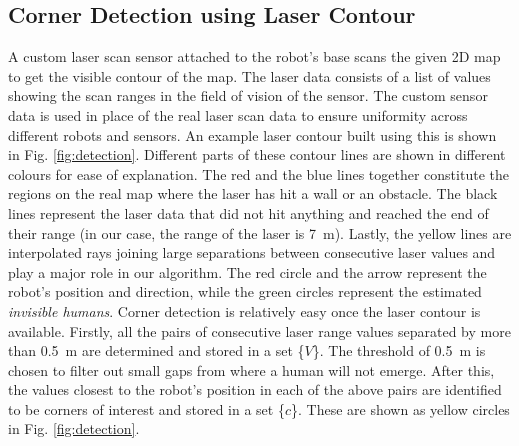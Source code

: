 \subsection{Corner Detection using Laser Contour}
A custom laser scan sensor attached to the robot's base scans the given 2D map to get the visible contour of the map. The laser data consists of a list of values showing the scan ranges in the field of vision of the sensor. The custom sensor data is used in place of the real laser scan data to ensure uniformity across different robots and sensors. An example laser contour built using this is shown in Fig. \ref{fig:detection}. Different parts of these contour lines are shown in different colours for ease of explanation. The red and the blue lines together constitute the regions on the real map where the laser has hit a wall or an obstacle. The black lines represent the laser data that did not hit anything and reached the end of their range (in our case, the range of the laser is \SI{7}{\meter}). Lastly, the yellow lines are interpolated rays joining large separations between consecutive laser values and play a major role in our algorithm. The red circle and the arrow represent the robot's position and direction, while the green circles represent the estimated \textit{invisible humans}. Corner detection is relatively easy once the laser contour is available. Firstly, all the pairs of consecutive laser range values separated by more than \SI{0.5}{\meter} are determined and stored in a set \{$V$\}. The threshold of \SI{0.5}{\meter} is chosen to filter out small gaps from where a human will not emerge. After this, the values closest to the robot's position in each of the above pairs are identified to be corners of interest and stored in a set \{$c$\}. These are shown as yellow circles in Fig. \ref{fig:detection}.
